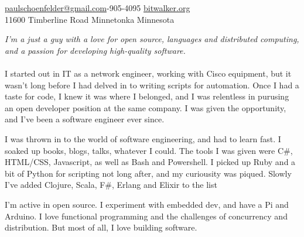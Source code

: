 \documentclass[10pt,a4paper]{article}
\begin{document}
\sloppy  %



\nobreakvspace{0.3em}  %

\noindent\href{mailto:paulschoenfelder@gmail.com}{paulschoenfelder\mbox{}@\mbox{}gmail.com}-905-4095\sbull
\href{http://bitwalker.org}{bitwalker.org}
\\
11600 Timberline Road\sbull
Minnetonka\sbull
Minnesota

\spacedhrule{0.9em}{-0.4em}  %


\vspace{-1.3em}  %
\begin{multicols}{2}  %
\noindent \emph{I'm a just a guy with a love for open source, languages and distributed computing, and a passion for developing high-quality software.}
\\
\\
I started out in IT as a network engineer, working with Cisco equipment, but it wasn't long before I had delved in to writing scripts for automation. Once I had a taste for code, I knew it was where I belonged, and I was relentless in purusing an open developer position at the same company. I was given the opportunity, and I've been a software engineer ever since.

I was thrown in to the world of software engineering, and had to learn fast. I soaked up books, blogs, talks, whatever I could. The tools I was given were C\#, HTML/CSS, Javascript, as well as Bash and Powershell. I picked up Ruby and a bit of Python for scripting not long after, and my curiousity was piqued. Slowly I've added Clojure, Scala, F\#, Erlang and Elixir to the list

I'm active in open source. I experiment with embedded dev, and have a Pi and Arduino. I love functional programming and the challenges of concurrency and distribution. But most of all, I love building software.
\end{multicols}
\end{document}
